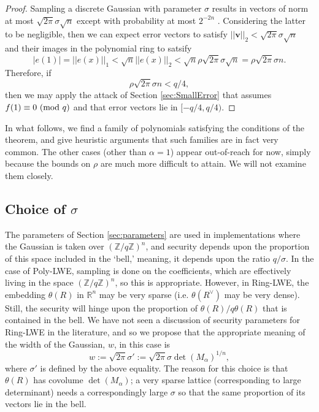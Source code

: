 \documentclass{llncs}
\newcommand{\RR}{\mathbb{R}}
\newcommand{\ZZ}{\mathbb{Z}}
\newcommand{\MOD}[1]{~(\textup{mod}~#1)}
\renewcommand{\pmod}{\MOD}
\newcommand{\<}{\langle}
\renewcommand{\>}{\rangle}
\begin{document}
\begin{proof}
        Sampling a discrete Gaussian with parameter $\sigma$ results in vectors of norm at most $\sqrt{2\pi}\sigma\sqrt{n}$ except with probability at most $2^{-2n}$ \cite[Lemma 2.8]{LPR2}.  Considering the latter to be negligible, then we can expect error vectors to satisfy $|| \mathbf{v} ||_2 < \sqrt{2\pi}\sigma\sqrt{n}$ and their images in the polynomial ring to satsify
        \[
                |e(1)| = || e(x) ||_1 < \sqrt{n}|| e(x) ||_2 < \sqrt{n} \rho \sqrt{2\pi}\sigma\sqrt{n} = \rho \sqrt{2\pi}\sigma n.
        \]
        Therefore, if
        \[
                \rho \sqrt{2\pi}\sigma n < q/4,
        \]
        then we may apply the attack of Section \ref{sec:SmallError} that assumes $f(1)\equiv 0 \pmod q$ and that error vectors lie in $[-q/4,q/4)$.
\end{proof}

In what follows, we find a family of polynomials satisfying the conditions of the theorem, and give heuristic arguments that such families are in fact very common.  The other cases (other than $\alpha=1$) appear out-of-reach for now, simply because the bounds on $\rho$ are much more difficult to attain.  We will not examine them closely.


\subsection{Choice of $\sigma$}


The parameters of Section \ref{sec:parameters} are used in implementations where the Gaussian is taken over $(\ZZ/q\ZZ)^n$, and security depends upon the proportion of this space included in the `bell,' meaning, it depends upon the ratio $q/\sigma$.  In the case of Poly-LWE, sampling is done on the coefficients, which are effectively living in the space $(\ZZ/q\ZZ)^n$, so this is appropriate.  However, in Ring-LWE, the embedding $\theta(R)$ in $\RR^n$ may be very sparse (i.e. $\theta(R^\vee)$ may be very dense).  Still, the security will hinge upon the proportion of $\theta(R)/q\theta(R)$ that is contained in the bell.  We have not seen a discussion of security parameters for Ring-LWE in the literature, and so we propose that the appropriate meaning of the width of the Gaussian, $w$, in this case is
\begin{equation}
        \label{eqn:s}
        w := \sqrt{2\pi} \sigma' := \sqrt{2\pi} \sigma {\det(M_\alpha)}^{1/n},
\end{equation}
where $\sigma'$ is defined by the above equality.
The reason for this choice is that $\theta(R)$ has covolume $\det(M_\alpha)$; a very sparse lattice (corresponding to large determinant) needs a correspondingly large $\sigma$ so that the same proportion of its vectors lie in the bell.
\end{document}
